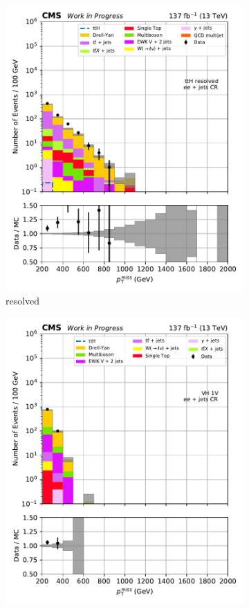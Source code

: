 \begin{figure}[htbp]
\begin{subfigure}[b]{0.24\textwidth}
        \includegraphics[width=\textwidth]{figures/region_plots/2016to18/region_4/ttH_resolved.pdf}
        \caption{\ttH resolved}
    \end{subfigure}
    \hfill
    \begin{subfigure}[b]{0.24\textwidth}
        \includegraphics[width=\textwidth]{figures/region_plots/2016to18/region_4/VH_1V.pdf}

\end{subfigure}
\end{figure}
